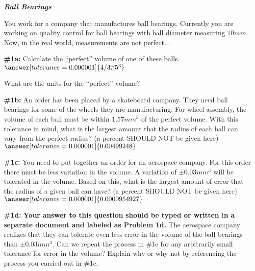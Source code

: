 \documentclass[handout,nooutcomes]{ximera}
\begin{document}
\begin{problem}{\textbf{\textit{Ball Bearings}}}

You work for a company that manufactures ball bearings. Currently you are working on quality control for ball bearings with ball diameter measuring $10mm$. Now, in the real world, measurements are not perfect...
    \begin{problem}{\textbf{\#1a:}}
    Calculate the ``perfect'' volume of one of these balls.
    $\answer[tolerance=0.000001]{4/3 \pi 5^3}$
    
    What are the units for the ``perfect'' volume?
    \begin{multipleChoice}
    \end{multipleChoice}
  
    \end{problem}
    \begin{problem}{\textbf{\#1b:}}
    An order has been placed by a skateboard company. They need ball bearings for some of the wheels they are manufacturing. For wheel assembly, the volume of each ball must be within $1.57mm^3$ of the perfect volume. With this tolerance in mind, what is the largest amount that the radius of each ball can vary from the perfect radius? (a percent SHOULD NOT be given here)
    $\answer[tolerance=0.000001]{0.00499248}$ 
    \end{problem}
    \begin{problem}{\textbf{\#1c:}}
    You need to put together an order for an aerospace company. For this order there must be less variation in the volume. A variation of $\pm0.03mm^3$ will be tolerated in the volume. Based on this, what is the largest amount of error that the radius of a given ball can have? (a percent SHOULD NOT be given here)
    $\answer[tolerance=0.000001]{0.0000954927}$
    \end{problem}
    
    
    \begin{problem}{\textbf{\#1d:}}
    \textbf{Your answer to this question should be typed or written in a separate document and labeled as Problem 1d.}
    The aerospace company realizes that they can tolerate even less error in the volume of the ball bearings than $\pm 0.03 mm^3$.  Can we repeat the process in \#1c for any arbitrarily small tolerance for error in the volume?  Explain why or why not by referencing the process you carried out in \#1c.
    \end{problem}
\end{problem}
\end{document}
